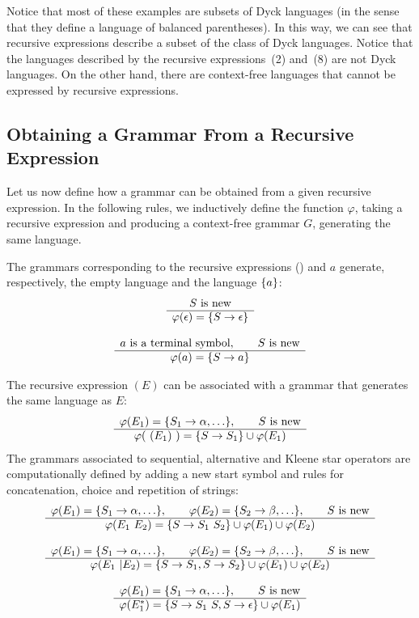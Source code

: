 \documentclass[runningheads]{llncs}
\begin{document}
Notice that most of these examples are subsets of Dyck languages (in the sense that they define a language of balanced parentheses).
In this way, we can see that recursive expressions describe a subset of the class of Dyck languages.
Notice that the languages described by the recursive expressions~(2) and~(8) are not Dyck languages.
On the other hand, there are context-free languages that cannot be expressed by recursive expressions.


\subsection{Obtaining a Grammar From a Recursive Expression}
\label{sec:transforming}

Let us now define how a grammar can be obtained from a given recursive expression.
In the following rules, we inductively define the function $\varphi$, taking a recursive expression and producing a context-free grammar $G$, generating the same language.

The grammars corresponding to the recursive expressions () and $a$  generate, respectively, the empty language and the language $\{ a \}$:
\[
\begin{array}{c} 
S\mbox{ is new}
 \\ \hline 
\varphi(\epsilon) = \{ S \to \epsilon \}
 \end{array}
\]

\[
\begin{array}{c} 
a\mbox{ is a terminal symbol}, \qquad S\mbox{ is new}
 \\ \hline 
\varphi(a) = \{ S \to a \}
 \end{array}
\]

The recursive expression $(E)$ can be associated with a grammar that generates the same language as $E$:
\[
\pfrule{
\varphi(E_1) = \set{\Rule{S_1}{\alpha}, \dots}, \qquad S\mbox{ is new}
}{
\varphi(\ (E_1)\ ) = \set{\Rule{S}{S_1}} \cup \varphi(E_1)
}
\]
The grammars associated to sequential, alternative and Kleene star operators are computationally defined by adding a new start symbol and rules for concatenation, choice and repetition of strings:
\[
\pfrule{
\varphi(E_1) = \set{\Rule{S_1}{\alpha}, \dots}, \qquad \varphi(E_2) = \set{\Rule{S_2}{\beta}, \dots},\qquad S\mbox{ is new}
}{
\varphi(E_1\ E_2) = \set{\Rule{S}{S_1\ S_2}} \cup \varphi(E_1) \cup \varphi(E_2)
}
\]

\[
\pfrule{
\varphi(E_1) = \set{\Rule{S_1}{\alpha}, \dots}, \qquad \varphi(E_2) = \set{\Rule{S_2}{\beta}, \dots},\qquad S\mbox{ is new}
}{
\varphi(E_1\ | E_2) = \set{\Rule{S}{S_1}, \Rule{S}{S_2}} \cup \varphi(E_1) \cup \varphi(E_2)
}
\]



\[
\pfrule{
\varphi(E_1) = \set{\Rule{S_1}{\alpha}, \dots}, \qquad S\mbox{ is new}
}{
\varphi( E_1^*) = \set{\Rule{S}{S_1\ S}, \Rule{S}{\epsilon}} \cup \varphi(E_1)
}
\]
\end{document}
